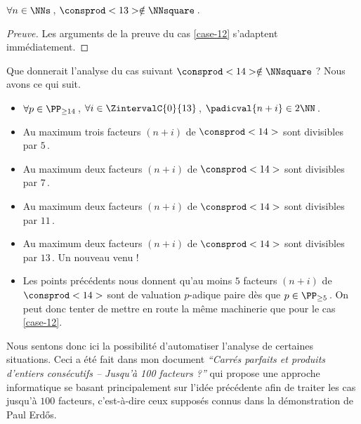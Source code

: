\begin{fact} \label{case-13}
	 $\forall n \in \NNs$\,, $\consprod<13> \notin \NNsquare$\,.
\end{fact}




\begin{proof}[Preuve]%
    Les arguments de la preuve du cas \ref{case-12} s'adaptent immédiatement.
\end{proof}




\begin{remark}
	Que donnerait l'analyse du cas suivant $\consprod<14> \notin \NNsquare$ ?
	Nous avons ce qui suit.
    \begin{itemize}
		\item $\forall p \in \PP_{\geq 14}$\,, 
    $\forall i \in \ZintervalC{0}{13}$\,, 
    $\padicval{n + i} \in 2 \NN$\,.
		
		\item Au maximum trois facteurs $(n + i)$ de $\consprod<14>$ sont divisibles par $5$\,.

		\item Au maximum deux facteurs $(n + i)$ de $\consprod<14>$ sont divisibles par $7$\,.

		\item Au maximum deux facteurs $(n + i)$ de $\consprod<14>$ sont divisibles par $11$\,.

		\item Au maximum deux facteurs $(n + i)$ de $\consprod<14>$ sont divisibles par $13$\,. Un nouveau venu !

		\item Les points précédents nous donnent qu'au moins $5$ facteurs $(n + i)$ de $\consprod<14>$ sont de valu\-ation $p$-adique paire dès que $p \in \PP_{\geq 5}$\,. On peut donc tenter de mettre en route la même machinerie que pour le cas \ref{case-12}. 
    \end{itemize}
    
    Nous sentons donc ici la possibilité d'automatiser l'analyse de certaines situations. 
    Ceci a été fait dans mon document \emph{\enquote{Carrés parfaits et produits d'entiers consécutifs -- Jusqu'à 100 facteurs ?}} qui propose une approche informatique se basant principalement sur l'idée précédente afin de traiter les cas jusqu'à $100$ facteurs, c'est-à-dire ceux supposés connus dans la démonstration de Paul Erdős.
\end{remark}

